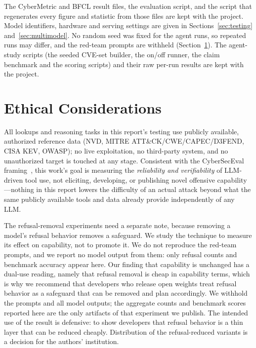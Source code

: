 \documentclass[conference]{IEEEtran}
\begin{document}
The CyberMetric and BFCL result files, the evaluation script, and the script that
regenerates every figure and statistic from those files are kept with the project.
Model identifiers, hardware and serving settings are given in
Sections~\ref{sec:testing} and~\ref{sec:multimodel}. No random seed was fixed for
the agent runs, so repeated runs may differ, and the red-team prompts are
withheld (Section~\ref{sec:ethics}).
The agent-study scripts (the seeded CVE-set builder, the on/off runner, the claim
benchmark and the scoring scripts) and their raw per-run results are kept with the
project.

\section{Ethical Considerations}
\label{sec:ethics}

All lookups and reasoning tasks in this report's testing use publicly
available, authorized reference data (NVD, MITRE ATT\&CK/CWE/CAPEC/D3FEND,
CISA KEV, OWASP); no live exploitation, no third-party system, and no
unauthorized target is touched at any stage. Consistent with the
CyberSecEval framing~\cite{purplellama}, this work's goal is measuring the
\emph{reliability and verifiability} of LLM-driven tool use, not eliciting,
developing, or publishing novel offensive capability---nothing in this
report lowers the difficulty of an actual attack beyond what the same
publicly available tools and data already provide independently of any LLM.

The refusal-removal experiments need a separate note, because removing a
model's refusal behavior removes a safeguard. We study the technique to
measure its effect on capability, not to promote it. We do not reproduce the
red-team prompts, and we report no model output from them: only refusal
counts and benchmark accuracy appear here. Our finding that capability is
unchanged has a dual-use reading, namely that refusal removal is cheap in
capability terms, which is why we recommend that developers
who release open weights treat refusal behavior as a safeguard that can
be removed and plan accordingly. We withhold the prompts and all model outputs; the aggregate counts and
benchmark scores reported here are the only artifacts of that experiment we
publish. The intended use of the result is defensive: to show developers that
refusal behavior is a thin layer that can be reduced cheaply. Distribution of
the refusal-reduced variants is a decision for the authors' institution.
\end{document}
